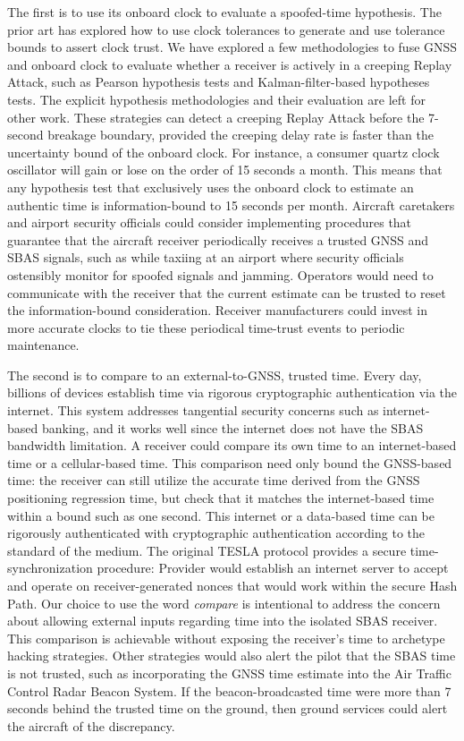 \documentclass[letterpaper,times]{IONconf/IONconf}
\begin{document}
	The first is to use its onboard clock to evaluate a spoofed-time hypothesis.
	The prior art has explored how to use clock tolerances to generate and use tolerance bounds to assert clock trust\cite{time_sync_paper}.
	We have explored a few methodologies to fuse GNSS and onboard clock to evaluate whether a receiver is actively in a creeping Replay Attack, such as Pearson hypothesis tests and Kalman-filter-based hypotheses tests.
	The explicit hypothesis methodologies and their evaluation are left for other work.
	These strategies can detect a creeping Replay Attack before the 7-second breakage boundary, provided the creeping delay rate is faster than the uncertainty bound of the onboard clock.
	For instance, a consumer quartz clock oscillator will gain or lose on the order of 15 seconds a month.
	This means that any hypothesis test that exclusively uses the onboard clock to estimate an authentic time is information-bound to 15 seconds per month.
	Aircraft caretakers and airport security officials could consider implementing procedures that guarantee that the aircraft receiver periodically receives a trusted GNSS and SBAS signals, such as while taxiing at an airport where security officials ostensibly monitor for spoofed signals and jamming.
	Operators would need to communicate with the receiver that the current estimate can be trusted to reset the information-bound consideration.
	Receiver manufacturers could invest in more accurate clocks to tie these periodical time-trust events to periodic maintenance.

	The second is to compare to an external-to-GNSS, trusted time.
	Every day, billions of devices establish time via rigorous cryptographic authentication via the internet.
	This system addresses tangential security concerns such as internet-based banking, and it works well since the internet does not have the SBAS bandwidth limitation.
	A receiver could compare its own time to an internet-based time or a cellular-based time.
	This comparison need only bound the GNSS-based time: the receiver can still utilize the accurate time derived from the GNSS positioning regression time, but check that it matches the internet-based time within a bound such as one second.
	This internet or a data-based time can be rigorously authenticated with cryptographic authentication according to the standard of the medium.
	The original TESLA protocol provides a secure time-synchronization procedure: Provider would establish an internet server to accept and operate on receiver-generated nonces that would work within the secure Hash Path\cite{perrig2005timed}.
	Our choice to use the word {\em compare} is intentional to address the concern about allowing external inputs regarding time into the isolated SBAS receiver.
	This comparison is achievable without exposing the receiver's time to archetype hacking strategies.
	Other strategies would also alert the pilot that the SBAS time is not trusted, such as incorporating the GNSS time estimate into the Air Traffic Control Radar Beacon System.
	If the beacon-broadcasted time were more than 7 seconds behind the trusted time on the ground, then ground services could alert the aircraft of the discrepancy.
\end{document}
